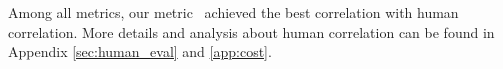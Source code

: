 \textcolor[rgb]{0,0,0}
 {Among all metrics, our metric \ours\ achieved the best correlation with human correlation. More details and analysis about human correlation can be found in Appendix \ref{sec:human_eval} and \ref{app:cost}.}











